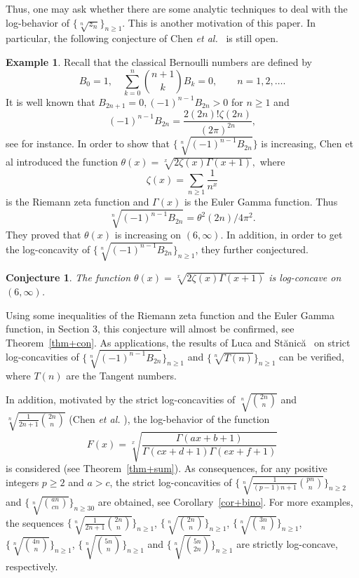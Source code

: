 \documentclass[12pt,reqno]{article}
\newtheorem{conj}[thm]{Conjecture}
\theoremstyle{definition}
\newtheorem{ex}[thm]{Example}
\numberwithin{equation}{section}
\begin{document}
Thus, one may ask whether there are some analytic techniques to deal
with the log-behavior of $\{\sqrt[n]{z_n}\}_{n\geq1}$. This is
another motivation of this paper. In particular, the following
conjecture of Chen {\it et al.}~\cite{CGW} is still open.
\begin{ex}
Recall that the classical Bernoulli numbers are defined by
$$B_0=1,\quad \sum_{k=0}^n\binom{n+1}{k}B_k=0,\qquad n=1,2,\ldots.$$
It is well known that $B_{2n+1}=0, (-1)^{n-1}B_{2n}>0$ for $n\ge 1$
and
$$(-1)^{n-1}B_{2n}=\frac{2(2n)!\zeta(2n)}{(2\pi)^{2n}},$$
see \cite[(6.89)]{GKP94} for instance. In order to show that
$\{\sqrt[n]{(-1)^{n-1}B_{2n}}\}$ is increasing, Chen et al
\cite{CGW} introduced the function $\theta(x)=\sqrt[x]{2
\zeta(x)\Gamma(x+1)},$ where
$$\zeta(x)=\sum_{n\geq1}\frac{1}{n^x}$$ is the Riemann zeta function and $\Gamma(x)$ is the Euler
Gamma function. Thus
$$\sqrt[n]{(-1)^{n-1}B_{2n}}={\theta^2(2n)}/{4\pi^{2}}.$$ They proved
that $\theta(x)$ is increasing on $(6,\infty)$. In addition, in
order to get the log-concavity of
$\{\sqrt[n]{(-1)^{n-1}B_{2n}}\}_{n\ge 1}$, they further conjectured.
\begin{conj}\emph{\cite{CGW}}\label{conj}
The function $\theta(x)=\sqrt[x]{2 \zeta(x)\Gamma(x+1)}$ is
log-concave on $(6,\infty)$.
\end{conj}
\end{ex}
Using some inequalities of the Riemann zeta function and the Euler
Gamma function, in Section 3, this conjecture will almost be
confirmed, see Theorem~\ref{thm+con}. As applications, the results
of Luca and St\u{a}nic\u{a}~\cite{LS12} on strict log-concavities of
$\{\sqrt[n]{(-1)^{n-1}B_{2n}}\}_{n\ge 1}$ and
$\{\sqrt[n]{T(n)}\}_{n\ge 1}$ can be verified, where $T(n)$ are the
Tangent numbers.


In addition, motivated by the strict log-concavities of
$\sqrt[n]{\binom{2n}{n}}$ and $\sqrt[n]{\frac{1}{2n+1}
\binom{2n}{n}}$ (Chen {\it et al.} \cite{CGW1}), the log-behavior of
the function
$$F(x)=\sqrt[x]{\frac{\Gamma(ax+b+1)}{\Gamma(c x+d+1)\Gamma(e
x+f+1)}}$$ is considered (see Theorem~\ref{thm+sum}). As
consequences, for any positive integers $p\geq2$ and $a> c$, the
strict log-concavities of
$\{\sqrt[n]{\frac{1}{(p-1)n+1}\binom{pn}{n}}\}_{n\geq2}$ and
$\{\sqrt[n]{\binom{an}{cn}}\}_{n\geq30}$ are obtained, see
Corollary~\ref{cor+bino}. For more examples, the sequences
$\{\sqrt[n]{\frac{1}{2n+1}\binom{2n}{n}}\}_{n\geq1}$,
$\{\sqrt[n]{\binom{2n}{n}}\}_{n\geq1}$,
$\{\sqrt[n]{\binom{3n}{n}}\}_{n\geq1}$,
$\{\sqrt[n]{\binom{4n}{n}}\}_{n\geq1}$,
$\{\sqrt[n]{\binom{5n}{n}}\}_{n\geq1}$ and
$\{\sqrt[n]{\binom{5n}{2n}}\}_{n\geq1}$ are strictly log-concave,
respectively.
\end{document}
